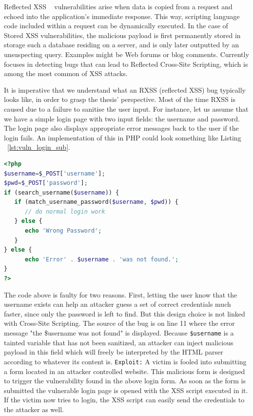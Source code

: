 Reflected XSS ~\cite{rxss_def} vulnerabilities arise when data is copied from a request and echoed into the application's immediate response. This way, scripting language code included within a request can be dynamically executed.
In the case of Stored XSS vulnerabilities, the malicious payload is first permanently stored in storage such a database residing on a server, and is only later outputted by an unsuspecting query. Examples might be Web forums or blog comments. 
Currently \pname focuses in detecting bugs that can lead to Reflected Cross-Site Scripting, which is among the most common of XSS attacks.

It is imperative that we understand what an RXSS (reflected XSS) bug typically looks like, in order to grasp the thesis' perspective. Most of the time RXSS is caused due to a failure to sanitise the user input. For instance, let us assume that we have a simple login page with two input fields: the username and password. The login page also displays appropriate error messages back to the user if the login fails. An implementation of this in PHP could look something like Listing ~\ref{lst:vuln_login_sub}.

\begin{lstlisting}[language=php, caption={Vulnerable login form.}, label={lst:vuln_login_sub}]
<?php
$username=$_POST['username'];
$pwd=$_POST['password'];
if (search_username($username)) {
   if (match_username_password($username, $pwd)) {
      // do normal login work
   } else {
      echo 'Wrong Password';
   }
} else {
      echo 'Error' . $username . 'was not found.';
}
?>
\end{lstlisting}

The code above is faulty for two reasons. First, letting the user know that the username exists can help an attacker guess a set of correct credentials much faster, since only the password is left to find. But this design choice is not linked with Cross-Site Scripting. The source of the bug is on line 11 where the error message "the \$username was not found" is displayed. Because {\tt \$username} is a tainted variable that has not been sanitized, an attacker can inject malicious payload in this field which will freely be interpreted by the HTML parser according to whatever its content is. 
{\tt Exploit:} A victim is fooled into submitting a form located in an attacker controlled website. This malicious form is
designed to trigger the vulnerability found in the above login form. As soon as the form is submitted the vulnerable login
page is opened with the XSS script executed in it. If the victim now tries to login, the XSS script can easily send the
credentials to the attacker as well. 

